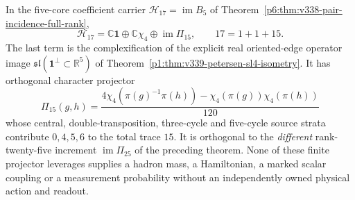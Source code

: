 \documentclass[12pt,a4paper]{article}
\begin{document}
\begin{corollary}
\label{p6:cor:v339-petersen-15-incidence-visibility}
In the five-core coefficient carrier $\mathcal H_{17}=\operatorname{im}B_5$
of Theorem~\ref{p6:thm:v338-pair-incidence-full-rank},
\[
 \mathcal H_{17}=\mathbb C\mathbf1\oplus
 \mathbb C\chi_4\oplus \operatorname{im}\Pi_{15},
 \qquad 17=1+1+15.
\]
The last term is the complexification of the explicit real
oriented-edge operator image
$\mathfrak{sl}(\mathbf1^\perp\subset\mathbb R^5)$ of
Theorem~\ref{p1:thm:v339-petersen-sl4-isometry}.
It has orthogonal character projector
\[
 \Pi_{15}(g,h)=\frac{4\chi_4(\pi(g)^{-1}\pi(h))
 -\chi_4(\pi(g))\chi_4(\pi(h))}{120}
\]
whose central, double-transposition, three-cycle and five-cycle
source strata contribute $0,4,5,6$ to the total trace $15$.
It is orthogonal to the \emph{different} rank-twenty-five
increment $\operatorname{im}\Pi_{25}$ of the preceding theorem.
None of these finite projector leverages supplies a hadron mass,
a Hamiltonian, a marked scalar coupling or a measurement probability
without an independently owned physical action and readout.
\end{corollary}


\end{document}
